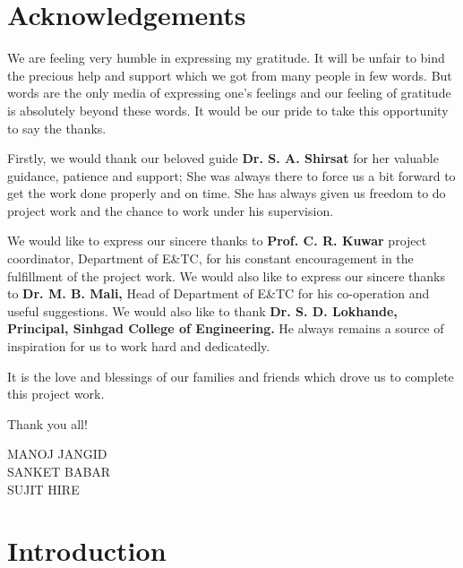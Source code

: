 \documentclass[12pt]{report}
\begin{document}
\chapter*{Acknowledgements}
\begin{flushleft}
We are feeling very humble in expressing my gratitude. It will be unfair to bind the precious help and support which we got from many people in few words. But words are the only media of expressing one's feelings and our feeling of gratitude is absolutely beyond these words. It would be our pride to take this opportunity to say the thanks.

Firstly, we would thank our beloved guide \textbf{Dr. S. A. Shirsat} for her valuable guidance, patience and support; She was always there to force us a bit forward to get the work done properly and on time. She has always given us freedom to do project work and the chance to work under his supervision.

We would like to express our sincere thanks to \textbf{Prof. C. R. Kuwar} project coordinator, Department of E\&TC, for his constant encouragement in the fulfillment of the project work. We would also like to express our sincere thanks to \textbf{Dr. M. B. Mali,} Head of Department of E\&TC for his co-operation and useful suggestions. We would also like to thank \textbf{Dr. S. D. Lokhande, Principal, Sinhgad College of Engineering.} He always remains a source of inspiration for us to work hard and dedicatedly.

It is the love and blessings of our families and friends which drove us to complete this project work.

Thank you all!
\end{flushleft}

\begin{flushright}
    MANOJ JANGID\\
    SANKET BABAR\\
    SUJIT HIRE
\end{flushright}
\newpage

\chapter{Introduction}
\end{document}
